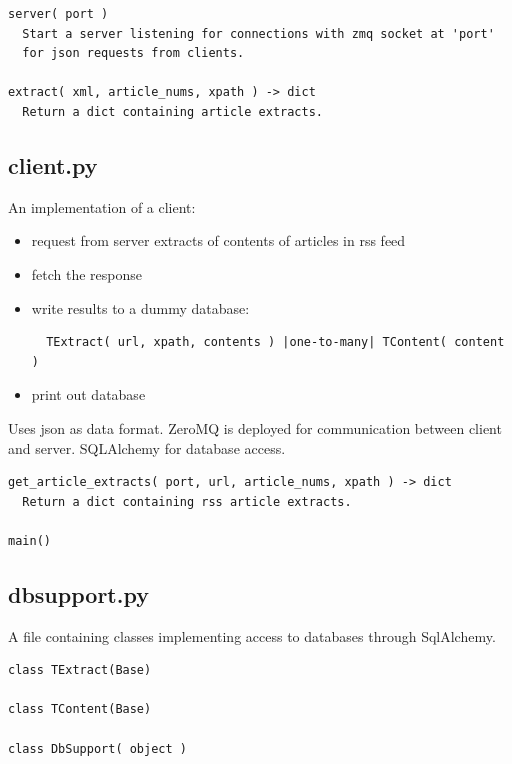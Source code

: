 \documentclass[a4paper,12pt]{article}
\begin{document}
\begin{verbatim}
server( port )
  Start a server listening for connections with zmq socket at 'port'
  for json requests from clients.

extract( xml, article_nums, xpath ) -> dict
  Return a dict containing article extracts.
\end{verbatim}




\subsection{client.py}

An implementation of a client:
\begin{itemize}
 \item request from server extracts of contents of articles in rss feed
 \item fetch the response
 \item write results to a dummy database:
 \begin{verbatim}
  TExtract( url, xpath, contents ) |one-to-many| TContent( content )
\end{verbatim}
 \item print out database
\end{itemize}

Uses json as data format.
ZeroMQ is deployed for communication between client and server.
SQLAlchemy for database access.


\begin{verbatim}
get_article_extracts( port, url, article_nums, xpath ) -> dict
  Return a dict containing rss article extracts.

main()
\end{verbatim}




\subsection{dbsupport.py}

A file containing classes implementing access to databases through SqlAlchemy.

\begin{verbatim}
class TExtract(Base)

class TContent(Base)

class DbSupport( object )
\end{verbatim}


\end{document}
